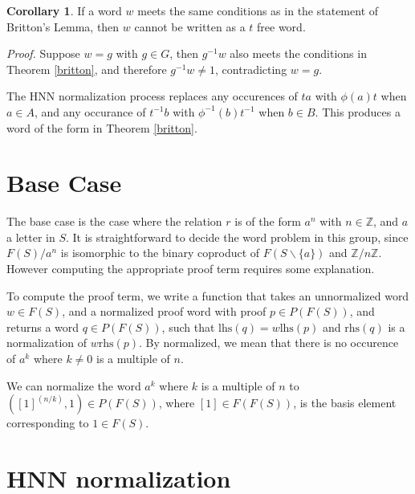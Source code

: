 \documentclass[11pt]{article} %
\theoremstyle{definition}
\theoremstyle{definition}
\newtheorem{corol}{Corollary}[theorem]
\theoremstyle{definition}
\theoremstyle{definition}
\theoremstyle{definition}
\newtheorem{defn}[theorem]{Definition}
\theoremstyle{definition}
\begin{document}
\begin{corol}\label{genbritton}
  If a word $w$ meets the same conditions as in the statement of Britton's Lemma,
  then $w$ cannot be written as a $t$ free word.
\end{corol}

\textit{Proof.} Suppose $w = g$ with $g \in G$, then $g^{-1}w$ also meets the conditions
in Theorem \ref{britton}, and therefore $g^{-1}w \ne 1$, contradicting $w = g$.

The HNN normalization process replaces any occurences of $ta$ with $\phi(a)t$ when $a \in A$, and
any occurance of $t^{-1}b$ with $\phi^{-1}(b)t^{-1}$ when $b \in B$. This produces a word of
the form in Theorem \ref{britton}.

\section{Base Case}

The base case is the case where the relation $r$ is of the form $a^n$ with
$n \in \mathbb{Z}$, and $a$ a letter in $S$. It is straightforward to decide
the word problem in this group, since $F(S) / a^n$ is isomorphic
to the binary coproduct of $F(S \backslash \{a\})$ and $\mathbb{Z}/n\mathbb{Z}$.
However computing the appropriate proof term requires some explanation.

To compute the proof term, we write a function that takes an unnormalized word
$w \in F(S)$, and a normalized proof word with proof $p \in P(F(S))$, and returns
a word $q \in P(F(S))$, such that $\text{lhs}(q) = w\text{lhs}(p)$ and
$\text{rhs}(q)$ is a normalization of $w \text{rhs}(p)$. By normalized,
we mean that there is no occurence of $a^k$ where $k \ne 0$ is a multiple of $n$.

We can normalize the word $a^k$ where $k$ is a multiple of $n$ to
$([1]^(n / k), 1) \in P(F(S))$, where $[1] \in F(F(S))$, is the basis element
corresponding to $1 \in F(S)$.


\section{HNN normalization}\label{HNNnorm}
\end{document}
